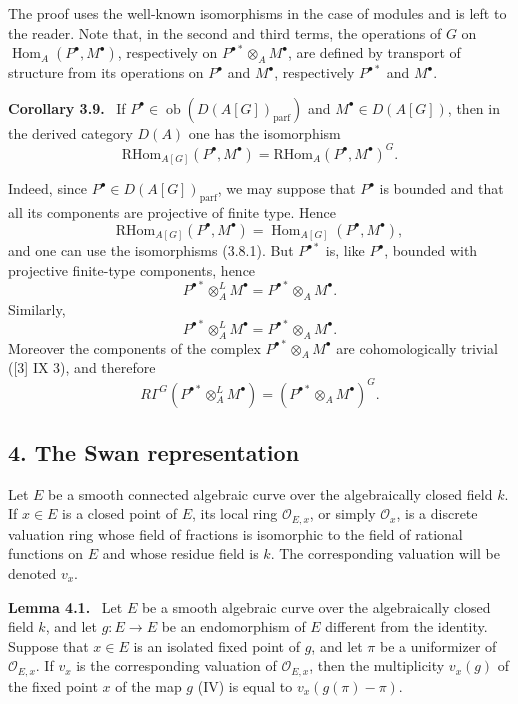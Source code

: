 \documentclass[11pt]{article}
\newenvironment{statement}[1]{\par\medskip\noindent\textbf{#1.}\ }{\par\medskip}
\DeclareMathOperator{\Hom}{Hom}
\providecommand{\RHom}{\mathrm{RHom}}
\providecommand{\parf}{\mathrm{parf}}
\providecommand{\Ob}{\operatorname{ob}}
\providecommand{\RHom}{\mathrm{RHom}}
\providecommand{\Hom}{\operatorname{Hom}}
\providecommand{\RHom}{\mathrm R\mathcal{H}om}
\providecommand{\Ob}{\operatorname{ob}}
\providecommand{\Ob}{\operatorname{Ob}}
\providecommand{\parf}{\mathrm{parf}}
\providecommand{\RHom}{\mathrm{RHom}}
\begin{document}
The proof uses the well-known isomorphisms in the case of modules and is left to the reader. Note that, in the second and third terms, the operations of $G$ on $\Hom_A(P^\bullet,M^\bullet)$, respectively on $P^{\bullet *}\otimes_A M^\bullet$, are defined by transport of structure from its operations on $P^\bullet$ and $M^\bullet$, respectively $P^{\bullet *}$ and $M^\bullet$.

\begin{statement}{Corollary 3.9}
If $P^\bullet\in\Ob(D(A[G])_{\parf})$ and $M^\bullet\in D(A[G])$, then in the derived category $D(A)$ one has the isomorphism
\[
\RHom_{A[G]}(P^\bullet,M^\bullet)=\RHom_A(P^\bullet,M^\bullet)^G.
\tag{3.9.1}
\]
\end{statement}

Indeed, since $P^\bullet\in D(A[G])_{\parf}$, we may suppose that $P^\bullet$ is bounded and that all its components are projective of finite type. Hence
\[
\RHom_{A[G]}(P^\bullet,M^\bullet)=\Hom_{A[G]}(P^\bullet,M^\bullet),
\]
and one can use the isomorphisms (3.8.1). But $P^{\bullet *}$ is, like $P^\bullet$, bounded with projective finite-type components, hence
\[
P^{\bullet *}\otimes_A^L M^\bullet=P^{\bullet *}\otimes_A M^\bullet.
\]
Similarly,
\[
P^{\bullet *}\otimes_A^L M^\bullet=P^{\bullet *}\otimes_A M^\bullet.
\]
Moreover the components of the complex $P^{\bullet *}\otimes_A M^\bullet$ are cohomologically trivial ([3] IX 3), and therefore
\[
R\Gamma^G(P^{\bullet *}\otimes_A^L M^\bullet)=(P^{\bullet *}\otimes_A M^\bullet)^G.
\]

\subsection*{4. The Swan representation}

Let $E$ be a smooth connected algebraic curve over the algebraically closed field $k$. If $x\in E$ is a closed point of $E$, its local ring $\mathcal O_{E,x}$, or simply $\mathcal O_x$, is a discrete valuation ring whose field of fractions is isomorphic to the field of rational functions on $E$ and whose residue field is $k$. The corresponding valuation will be denoted $v_x$.

\begin{statement}{Lemma 4.1}
Let $E$ be a smooth algebraic curve over the algebraically closed field $k$, and let $g:E\to E$ be an endomorphism of $E$ different from the identity. Suppose that $x\in E$ is an isolated fixed point of $g$, and let $\pi$ be a uniformizer of $\mathcal O_{E,x}$. If $v_x$ is the corresponding valuation of $\mathcal O_{E,x}$, then the multiplicity $v_x(g)$ of the fixed point $x$ of the map $g$ (IV) is equal to $v_x(g(\pi)-\pi)$.
\end{statement}
\end{document}
